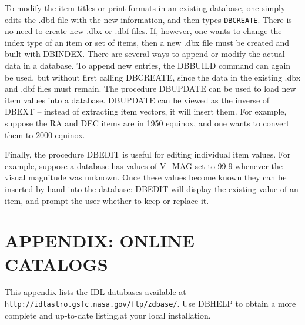 To modify the item titles or print formats in
an existing database, one simply edits the .dbd file with the new information,
and then types {\tt DBCREATE}.   There is no need to create new .dbx or .dbf
files.  If, however, one wants to change the index type of an item or 
set of items, then a new .dbx file must be created and built with DBINDEX.
\exbegin
{}
\exend
There are several ways to append or modify the actual data in a database.
To append new entries, the DBBUILD command can again be used, but without
first calling DBCREATE, since the data in the existing .dbx and .dbf files
must remain.  The procedure DBUPDATE can be used to load new item values into
a database.  DBUPDATE can be viewed as the inverse of DBEXT -- instead of
extracting item vectors, it will insert them.  For example, suppose the RA and
DEC items are in 1950 equinox, and one wants to convert them to 2000 equinox.
\exbegin
{}

Finally, the procedure DBEDIT is useful for editing individual item
values.  For example, suppose a database has values of V\_MAG set to 
99.9 whenever the visual magnitude was unknown.  Once these values become
known they can be inserted by hand into the database:
\exbegin
{}
\exend
DBEDIT will display the existing value of an item, and prompt the user
whether to keep or replace it.

\newpage
\section{APPENDIX:  ONLINE CATALOGS}
This appendix lists the IDL databases available at 
{\tt http://idlastro.gsfc.nasa.gov/ftp/zdbase/}.  Use
DBHELP to obtain a more complete and up-to-date listing.at your local
installation.   

\vspace{0.15in}

